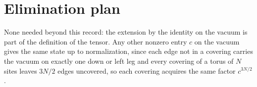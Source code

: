 \documentclass{article}
\begin{document}
\section{Elimination plan}
None needed beyond this record: the extension by the identity on the vacuum
is part of the definition of the tensor. Any other nonzero entry $c$ on the
vacuum gives the same state up to normalization, since each edge not in a
covering carries the vacuum on exactly one down or left leg and every
covering of a torus of $N$ sites leaves $3N/2$ edges uncovered, so each
covering acquires the same factor $c^{3N/2}$.



\end{document}
